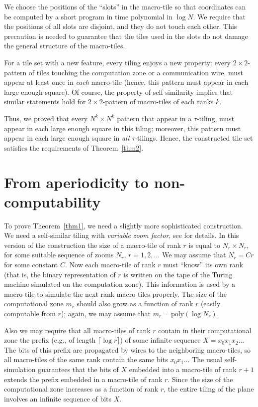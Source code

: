 \documentclass[runningheads]{llncs}
\newcommand{\poly}{\mathrm{poly}}
\begin{document}
We choose the positions of the ``slots'' in the macro-tile so that coordinates can be computed by a short program in time polynomial in $\log N$. We require that the positions of all slots are disjoint, and they do not touch each other. This precaution is needed to guarantee that the tiles used in the slots do not damage the general structure of the macro-tiles.

For a tile set with a new feature, every tiling enjoys a new property: every $2\times 2$-pattern of tiles touching the computation zone or a communication wire, must appear at least once in \emph{each} macro-tile (hence, this pattern must appear in each large enough square). Of course, the property of self-similarity implies that similar statements hold for  $2\times 2$-pattern of macro-tiles of each ranks $k$. 


Thus, we proved that every $N^k\times N^k$ pattern that appear in a $\tau$-tiling, must appear in each large enough square in this tiling; moreover,  this pattern must appear in each large enough square in \emph{all} $\tau$-tilings. Hence, the constructed tile set satisfies the requirements of Theorem~\ref{thm2}. 

\section{From aperiodicity to non-computability}

To prove Theorem~\ref{thm1}, we need a slightly more sophisticated construction. We need a self-similar tiling with \emph{variable zoom factor}, see
 \cite{drs} for details. In this version of the construction the size of a macro-tile of rank $r$ is equal to $N_r\times N_r$, for some suitable sequence of zooms $N_r$, $r=1,2,\ldots$ We may assume that $N_r = Cr$ for some constant $C$.   Now each macro-tile of rank $r$ must ``know'' its own rank (that is, the binary representation of $r$ is written on the tape of the Turing machine simulated on the computation zone). This information is used by a macro-tile to simulate the next rank macro-tiles properly.  The size of the computational zone $m_r$ should also grow as a  function of rank $r$ (easily computable from $r$); again, we may assume that $m_r = \poly(\log N_r)$.

Also we may require that all macro-tiles of rank $r$ contain in their computational zone the prefix (e.g., of length $\lceil \log r \rceil $) of some infinite sequence
 $X=x_0x_1x_2\ldots$
The bits of this prefix are propagated by wires to the neighboring macro-tiles, so all macro-tiles of the same rank contain the same bits $x_0x_1\ldots$  The usual self-simulation guarantees that the bits of $X$ embedded into a macro-tile of rank $r+1$ extends the prefix embedded in a macro-tile of rank $r$. Since the size of the computational zone increases as a function of rank $r$, the entire tiling of the plane involves an infinite sequence of bits $X$.
\end{document}
